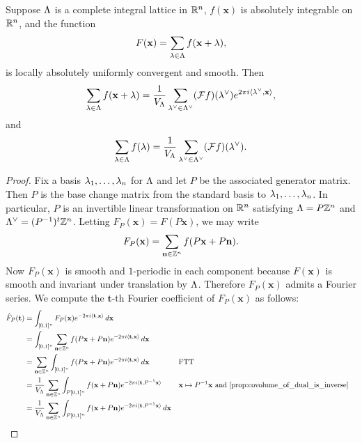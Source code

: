       \begin{theorem*}
        Suppose $\Lambda$ is a complete integral lattice in $\mathbb{R}^{n}$, $f(\mathbf{x})$ is absolutely integrable on $\mathbb{R}^{n}$, and the function
        \[
          F(\mathbf{x}) = \sum_{\lambda \in \Lambda}f(\mathbf{x}+\lambda),
        \]
        is locally absolutely uniformly convergent and smooth. Then
        \[
          \sum_{\lambda \in \Lambda}f(\mathbf{x}+\lambda) = \frac{1}{V_{\Lambda}}\sum_{\lambda^{\vee} \in \Lambda^{\vee}}(\mathcal{F}f)(\lambda^{\vee})e^{2\pi i\langle\lambda^{\vee},\mathbf{x}\rangle},
        \]
        and
        \[
          \sum_{\lambda \in \Lambda}f(\lambda) = \frac{1}{V_{\Lambda}}\sum_{\lambda^{\vee} \in \Lambda^{\vee}}(\mathcal{F}f)(\lambda^{\vee}).
        \]
      \end{theorem*}
      \begin{proof}
        Fix a basis $\lambda_{1},\ldots,\lambda_{n}$ for $\Lambda$ and let $P$ be the associated generator matrix. Then $P$ is the base change matrix from the standard basis to $\lambda_{1},\ldots,\lambda_{n}$. In particular, $P$ is an invertible linear transformation on $\mathbb{R}^{n}$ satisfying $\Lambda = P\mathbb{Z}^{n}$ and $\Lambda^{\vee} = (P^{-1})^{t}\mathbb{Z}^{n}$. Letting $ F_{P}(\mathbf{x}) = F(P\mathbf{x})$, we may write
        \[
          F_{P}(\mathbf{x}) = \sum_{\mathbf{n} \in \mathbb{Z}^{n}}f(P\mathbf{x}+P\mathbf{n}).
        \]
        Now $F_{P}(\mathbf{x})$ is smooth and $1$-periodic in each component because $F(\mathbf{x})$ is smooth and invariant under translation by $\Lambda$. Therefore $F_{P}(\mathbf{x})$ admits a Fourier series. We compute the $\mathbf{t}$-th Fourier coefficient of $F_{P}(\mathbf{x})$ as follows:
        \begin{align*}
          \hat{F}_{P}(\mathbf{t}) &= \int_{[0,1]^{n}}F_{P}(\mathbf{x})e^{-2\pi i\<\mathbf{t},\mathbf{x}\>}\,d\mathbf{x} \\
          &= \int_{[0,1]^{n}}\sum_{\mathbf{n} \in \Z^{n}}f(P\mathbf{x}+P\mathbf{n})e^{-2\pi i\<\mathbf{t},\mathbf{x}\>}\,d\mathbf{x} \\
          &= \sum_{\mathbf{n} \in \Z^{n}}\int_{[0,1]^{n}}f(P\mathbf{x}+P\mathbf{n})e^{-2\pi i\<\mathbf{t},\mathbf{x}\>}\,d\mathbf{x} && \text{FTT} \\
          &= \frac{1}{V_{\L}}\sum_{\mathbf{n} \in \Z^{n}}\int_{P[0,1]^{n}}f(\mathbf{x}+P\mathbf{n})e^{-2\pi i\<\mathbf{t},P^{-1}\mathbf{x}\>} && \text{$\mathbf{x} \mapsto P^{-1}\mathbf{x}$ and \cref{prop:covolume_of_dual_is_inverse}} \\
          &= \frac{1}{V_{\L}}\sum_{\mathbf{n} \in \Z^{n}}\int_{P[0,1]^{n}}f(\mathbf{x}+P\mathbf{n})e^{-2\pi i\<\mathbf{t},P^{-1}\mathbf{x}\>}\,d\mathbf{x} \\

\end{align*}
\end{proof}
